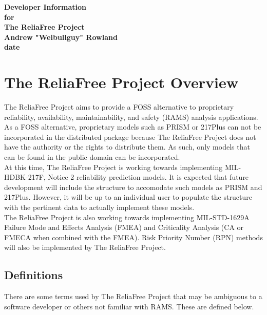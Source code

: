 \documentclass[11pt, 12pt, twoside, onecolumn]{article}
\begin{document}
\begin{titlepage}
\centering
{\Large \bf Developer Information} \\
{\Large \bf for} \\
{\Large \bf The ReliaFree Project} \\
\bigskip
{\large \bf Andrew "Weibullguy" Rowland} \\
{\Large \bf date}
\end{titlepage}
\linespread{1}

\tableofcontents
\newpage

\section{\bf \Large The ReliaFree Project Overview}

\noindent The ReliaFree Project aims to provide a FOSS alternative to proprietary reliability, availability, maintainability, and safety (RAMS) analysis applications.  As a FOSS alternative, proprietary models such as PRISM or 217Plus can not be incorporated in the distributed package because The ReliaFree Project does not have the authority or the rights to distribute them.  As such, only models that can be found in the public domain can be incorporated. \\

\noindent At this time, The ReliaFree Project is working towards implementing MIL-HDBK-217F, Notice 2 reliability prediction models.  It is expected that future development will include the structure to accomodate such models as PRISM and 217Plus.  However, it will be up to an individual user to populate the structure with the pertinent data to actually implement these models. \\

\noindent The ReliaFree Project is also working towards implementing MIL-STD-1629A Failure Mode and Effects Analysis (FMEA) and Criticality Analysis (CA or FMECA when combined with the FMEA).  Risk Priority Number (RPN) methods will also be implemented by The ReliaFree Project. \\

\subsection{\bf \large Definitions}

\noindent There are some terms used by The ReliaFree Project that may be ambiguous to a software developer or others not familiar with RAMS.  These are defined below.
\end{document}
